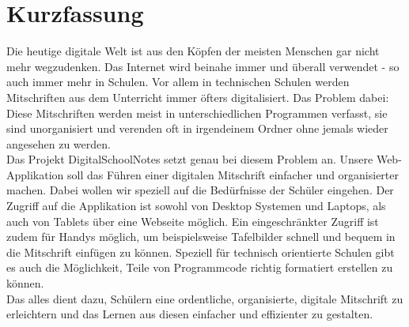 \section*{Kurzfassung}

Die heutige digitale Welt ist aus den Köpfen der meisten Menschen gar nicht mehr wegzudenken. Das Internet wird beinahe immer und überall verwendet - so auch immer mehr in Schulen. Vor allem in technischen Schulen werden Mitschriften aus dem Unterricht immer öfters digitalisiert. Das Problem dabei: Diese Mitschriften werden meist in unterschiedlichen Programmen verfasst, sie sind unorganisiert und verenden oft in irgendeinem Ordner ohne jemals wieder angesehen zu werden.\\
Das Projekt DigitalSchoolNotes setzt genau bei diesem Problem an. Unsere Web-Applikation soll das Führen einer digitalen Mitschrift einfacher und organisierter machen. Dabei wollen wir speziell auf die Bedürfnisse der Schüler eingehen. Der Zugriff auf die Applikation ist sowohl von Desktop Systemen und Laptops, als auch von Tablets über eine Webseite möglich. Ein eingeschränkter Zugriff ist zudem für Handys möglich, um beispielsweise Tafelbilder schnell und bequem in die Mitschrift einfügen zu können. Speziell für technisch orientierte Schulen gibt es auch die Möglichkeit, Teile von Programmcode richtig formatiert erstellen zu können. \\
Das alles dient dazu, Schülern eine ordentliche, organisierte, digitale Mitschrift zu erleichtern und das Lernen aus diesen einfacher und effizienter zu gestalten.